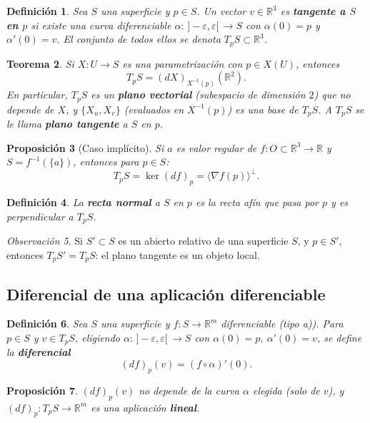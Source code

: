 \documentclass[11pt]{article}
\theoremstyle{plain}
\newtheorem{teorema}{Teorema}[section]
\newtheorem{definicion}[teorema]{Definición}
\newtheorem{proposicion}[teorema]{Proposición}
\theoremstyle{definition}
\theoremstyle{remark}
\newtheorem{observacion}[teorema]{Observación}
\begin{document}
\begin{definicion}
Sea $S$ una superficie y $p\in S$. Un vector $v\in\mathbb{R}^3$ es \textbf{tangente a $S$ en $p$} si existe una curva diferenciable $\alpha:\,]-\varepsilon,\varepsilon[\,\to S$ con $\alpha(0)=p$ y $\alpha'(0)=v$. El conjunto de todos ellos se denota $T_pS\subset\mathbb{R}^3$.
\end{definicion}

\begin{teorema}
Si $X:U\to S$ es una parametrización con $p\in X(U)$, entonces
\[
\boxed{T_pS=(dX)_{X^{-1}(p)}(\mathbb{R}^2)}.
\]
En particular, $T_pS$ es un \textbf{plano vectorial} (subespacio de dimensión $2$) que no depende de $X$, y $\{X_u,X_v\}$ (evaluados en $X^{-1}(p)$) es una base de $T_pS$. A $T_pS$ se le llama \textbf{plano tangente} a $S$ en $p$.
\end{teorema}

\begin{proposicion}[Caso implícito]
Si $a$ es valor regular de $f:O\subset\mathbb{R}^3\to\mathbb{R}$ y $S=f^{-1}(\{a\})$, entonces para $p\in S$:
\[
\boxed{T_pS=\ker(df)_p=\langle\nabla f(p)\rangle^\perp}.
\]
\end{proposicion}

\begin{definicion}
La \textbf{recta normal} a $S$ en $p$ es la recta afín que pasa por $p$ y es perpendicular a $T_pS$.
\end{definicion}

\begin{observacion}
Si $S'\subset S$ es un abierto relativo de una superficie $S$, y $p\in S'$, entonces $T_pS'=T_pS$: el plano tangente es un objeto local.
\end{observacion}

\subsection{Diferencial de una aplicación diferenciable}

\begin{definicion}
Sea $S$ una superficie y $f:S\to\mathbb{R}^m$ diferenciable (tipo a)). Para $p\in S$ y $v\in T_pS$, eligiendo $\alpha:\,]-\varepsilon,\varepsilon[\,\to S$ con $\alpha(0)=p,\ \alpha'(0)=v$, se define la \textbf{diferencial}
\[
(df)_p(v)=(f\circ\alpha)'(0).
\]
\end{definicion}

\begin{proposicion}
$(df)_p(v)$ no depende de la curva $\alpha$ elegida (solo de $v$), y $(df)_p:T_pS\to\mathbb{R}^m$ es una aplicación \textbf{lineal}.
\end{proposicion}
\end{document}
